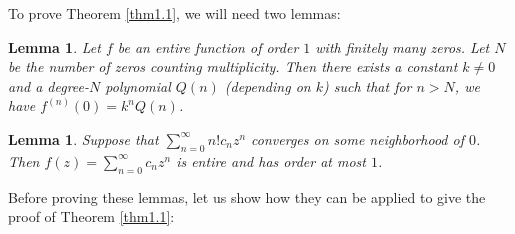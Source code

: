 \documentclass[12pt,a4paper,reqno]{amsart}
\numberwithin{equation}{section}
\theoremstyle{plain}
\newtheorem{lemma}[theorem]{Lemma}
\theoremstyle{definition}
\begin{document}
    To prove Theorem \ref{thm1.1}, we will need two lemmas:
    \begin{lemma}\label{lem1.2}
        Let $f$ be an entire function of order $1$ with finitely many zeros. Let $N$ be the number of zeros counting multiplicity. Then there exists a constant $k\neq 0$ and a degree-$N$ polynomial $Q(n)$ (depending on $k$) such that for $n>N$, we have $f^{(n)}(0)=k^nQ(n)$.
    \end{lemma}
    \begin{lemma}\label{lem1.3}
        Suppose that $\sum_{n=0}^\infty n!c_n z^n$ converges on some neighborhood of $0$. Then $f(z)=\sum_{n=0}^\infty c_n z^n$ is entire and has order at most $1$.
    \end{lemma}
    Before proving these lemmas, let us show how they can be applied to give the proof of Theorem \ref{thm1.1}:
\end{document}
